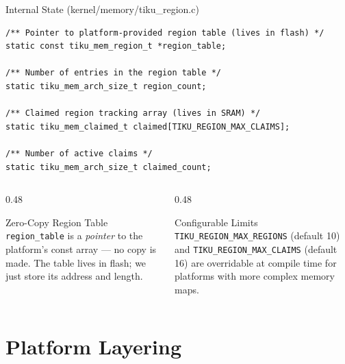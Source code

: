 \documentclass[aspectratio=169, 10pt]{beamer}
\begin{document}
\begin{frame}[fragile]{Internal State (kernel/memory/tiku\_region.c)}
\begin{lstlisting}[style=cstyle]
/** Pointer to platform-provided region table (lives in flash) */
static const tiku_mem_region_t *region_table;

/** Number of entries in the region table */
static tiku_mem_arch_size_t region_count;

/** Claimed region tracking array (lives in SRAM) */
static tiku_mem_claimed_t claimed[TIKU_REGION_MAX_CLAIMS];

/** Number of active claims */
static tiku_mem_arch_size_t claimed_count;
\end{lstlisting}

\vspace{0.3em}
\begin{columns}[T]
\begin{column}{0.48\textwidth}
\begin{block}{Zero-Copy Region Table}
\texttt{region\_table} is a \emph{pointer} to the platform's const
array --- no copy is made.  The table lives in flash; we just store
its address and length.
\end{block}
\end{column}
\begin{column}{0.48\textwidth}
\begin{block}{Configurable Limits}
\texttt{TIKU\_REGION\_MAX\_REGIONS} (default 10) and
\texttt{TIKU\_REGION\_MAX\_CLAIMS} (default 16) are overridable
at compile time for platforms with more complex memory maps.
\end{block}
\end{column}
\end{columns}
\end{frame}

\section{Platform Layering}
\end{document}
